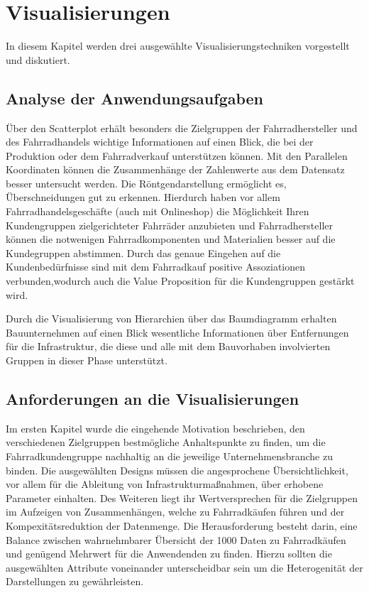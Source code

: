 \documentclass[usegeometry=true]{scrartcl}
\begin{document}
\section{Visualisierungen}
In diesem Kapitel werden drei ausgewählte Visualisierungstechniken vorgestellt und diskutiert.
\subsection{Analyse der Anwendungsaufgaben}
Über den Scatterplot erhält besonders die Zielgruppen der Fahrradhersteller und des Fahrradhandels wichtige Informationen auf einen Blick, die bei der Produktion oder dem Fahrradverkauf unterstützen können. 
Mit den Parallelen Koordinaten können die Zusammenhänge der Zahlenwerte aus dem Datensatz besser untersucht werden. Die Röntgendarstellung ermöglicht es, Überschneidungen gut zu erkennen. Hierdurch haben vor allem Fahrradhandelsgeschäfte (auch mit Onlineshop) die Möglichkeit Ihren Kundengruppen zielgerichteter Fahrräder anzubieten und Fahrradhersteller können die notwenigen Fahrradkomponenten und Materialien besser auf die Kundegruppen abstimmen.
Durch das genaue Eingehen auf die Kundenbedürfnisse sind mit dem Fahrradkauf positive Assoziationen verbunden,wodurch auch die Value Proposition für die Kundengruppen gestärkt wird. 

Durch die Visualisierung von Hierarchien über das Baumdiagramm erhalten Bauunternehmen auf einen Blick wesentliche Informationen über Entfernungen für die Infrastruktur, die diese und alle mit dem Bauvorhaben involvierten Gruppen in dieser Phase unterstützt.

\subsection{Anforderungen an die Visualisierungen}
Im ersten Kapitel wurde die eingehende Motivation beschrieben, den verschiedenen Zielgruppen bestmögliche Anhaltspunkte zu finden, um die Fahrradkundengruppe nachhaltig an die jeweilige Unternehmensbranche zu binden. Die ausgewählten Designs müssen die angesprochene Übersichtlichkeit, vor allem für die Ableitung von Infrastrukturmaßnahmen, über erhobene Parameter einhalten. Des Weiteren liegt ihr Wertversprechen für die Zielgruppen im Aufzeigen von Zusammenhängen, welche zu Fahrradkäufen führen und der Kompexitätsreduktion der Datenmenge. Die Herausforderung besteht darin, eine Balance zwischen wahrnehmbarer Übersicht der 1000 Daten zu Fahrradkäufen und genügend Mehrwert für die Anwendenden zu finden. Hierzu sollten die ausgewählten Attribute voneinander unterscheidbar sein um die Heterogenität der Darstellungen zu gewährleisten.
\end{document}
